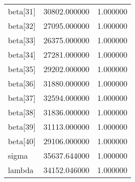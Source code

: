 \begin{tabular}{lrr}
beta[31] & 30802.000000 & 1.000000 \\
beta[32] & 27095.000000 & 1.000000 \\
beta[33] & 26375.000000 & 1.000000 \\
beta[34] & 27281.000000 & 1.000000 \\
beta[35] & 29202.000000 & 1.000000 \\
beta[36] & 31880.000000 & 1.000000 \\
beta[37] & 32594.000000 & 1.000000 \\
beta[38] & 31836.000000 & 1.000000 \\
beta[39] & 31113.000000 & 1.000000 \\
beta[40] & 29106.000000 & 1.000000 \\
sigma & 35637.644000 & 1.000000 \\
lambda & 34152.046000 & 1.000000 \\
\bottomrule
\end{tabular}
